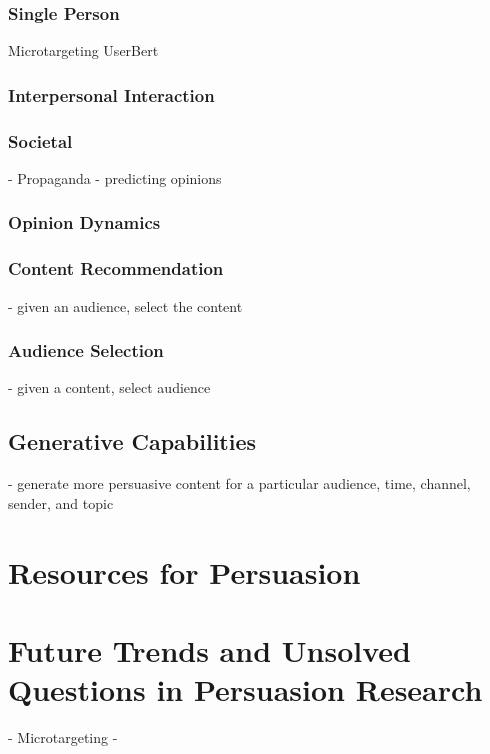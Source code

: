 \documentclass{article} %
\begin{document}
    
        \subsubsection{Single Person}
            Microtargeting
            UserBert
            

        \subsubsection{Interpersonal Interaction}

        \subsubsection{Societal}
            - Propaganda
            - predicting opinions
            


        \subsubsection{Opinion Dynamics}
        \subsubsection{Content Recommendation}
            - given an audience, select the content
        \subsubsection{Audience Selection}
            - given a content, select audience

    \subsection{Generative Capabilities}
        - generate more persuasive content for a particular audience, time, channel, sender, and topic 

    
    
\section{Resources for Persuasion}

\section{Future Trends and Unsolved Questions in Persuasion Research}
- Microtargeting
- 






\end{document}
